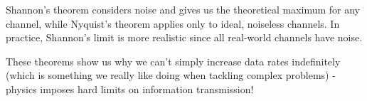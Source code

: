 \begin{importantblock}
    Shannon's theorem considers noise and gives us the theoretical maximum for any channel, while Nyquist's theorem applies only to ideal, noiseless channels. In practice, Shannon's limit is more realistic since all real-world channels have noise.
\end{importantblock}

These theorems show us why we can't simply increase data rates indefinitely (which is something we really like doing when tackling complex problems) - physics imposes hard limits on information transmission!